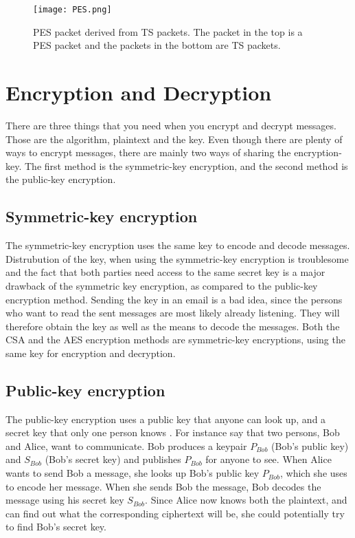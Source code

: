 \begin{figure}[h!]
  \texttt{[image: PES.png]}
  \caption{PES packet derived from TS packets. The packet in the top 
    is a PES packet and the packets in the bottom are TS packets.}
  \label{img:PES}
\end{figure}

\section{Encryption and Decryption}
There are three things that you need when you encrypt and decrypt 
messages. Those are the algorithm, plaintext and the key. Even though 
there are plenty of ways to encrypt messages, there are mainly two ways
of sharing the encryption-key. The first method is the symmetric-key 
encryption, and the second method is the public-key encryption. 
\citep{Schneier:2003}

\subsection{Symmetric-key encryption}\label{ch:symmetric}
The symmetric-key encryption uses the same key to encode and decode 
messages. Distrubution of the key, when using the symmetric-key 
encryption is troublesome and the fact that both parties need access 
to the same secret key is a major drawback of the symmetric key 
encryption, as compared to the public-key encryption method. Sending 
the key in an email is a bad idea, since the persons who want to read 
the sent messages are most likely already listening. They will 
therefore obtain the key as well as the means to decode the messages. 
Both the CSA and the AES encryption methods are symmetric-key 
encryptions, using the same key for encryption and decryption. 
\citep{Schneier:2003}

\subsection{Public-key encryption}\label{ch:public}
The public-key encryption uses a public key that anyone can look up, 
and a secret key that only one person knows 
\citep[pp. 25--32]{Simmons:1992}. For instance say that two persons, 
Bob and Alice, want to communicate. Bob produces a keypair \(P_{Bob}\) 
(Bob’s public key) and \(S_{Bob}\) (Bob’s secret key) and publishes 
\(P_{Bob}\) for anyone to see. When Alice wants to send Bob a message, 
she looks up Bob’s public key \(P_{Bob}\), which she uses to encode her 
message. When she sends Bob the message, Bob decodes the message using 
his secret key \(S_{Bob}\). Since Alice now knows both 
the plaintext, and can find out what the corresponding ciphertext will 
be, she could potentially try to find Bob's secret key. 
\citep{Schneier:2003}

